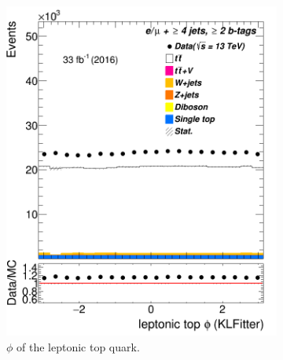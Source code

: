 \begin{figure}
\begin{subfigure}{0.25\textwidth}
	\includegraphics[width=\linewidth]{ControlPlots_emujets_2016_4incl_2incl/klf_topLep_phi_emujets_2016.png}
	\caption{$\phi$ of the leptonic top quark.} \label{fig:K13}
\end{subfigure}
\hspace*{0.5cm}
\begin{subfigure}{0.25\textwidth}

\end{subfigure}
\end{figure}
